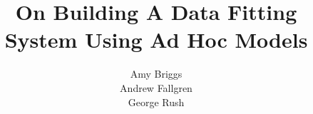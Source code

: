 \documentclass{sig-alternate}
\begin{document}
%

\title{On Building A Data Fitting System Using Ad Hoc Models}

%
%
%
%
%

%
\author{
%
%
\alignauthor
    Amy Briggs \\
\alignauthor
    Andrew Fallgren \\
\alignauthor
    George Rush \\
}
\end{document}
